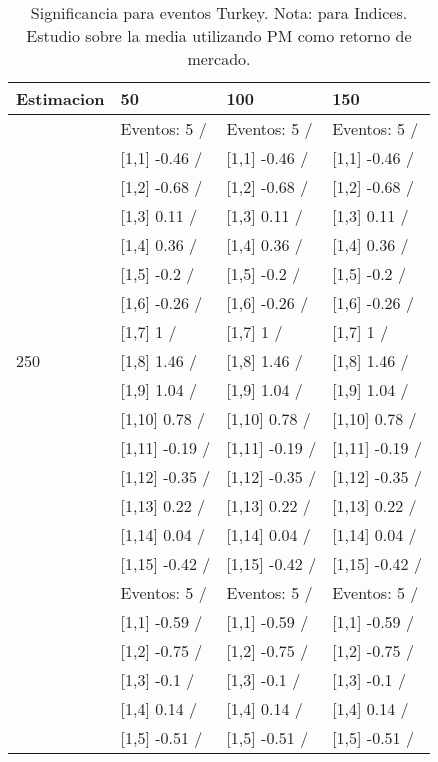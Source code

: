 \begin{table}

\caption{Significancia para eventos Turkey. Nota: para Indices. Estudio sobre la media utilizando PM como retorno de mercado.}
\centering
\begin{tabular}[t]{llll}
\toprule
Estimacion & 50 & 100 & 150\\
\midrule
 & Eventos:  5 / & Eventos:  5 / & Eventos:  5 /\\
 & {}[1,1] -0.46  / & {}[1,1] -0.46  / & {}[1,1] -0.46  /\\
 & {}[1,2] -0.68  / & {}[1,2] -0.68  / & {}[1,2] -0.68  /\\
 & {}[1,3] 0.11  / & {}[1,3] 0.11  / & {}[1,3] 0.11  /\\
 & {}[1,4] 0.36  / & {}[1,4] 0.36  / & {}[1,4] 0.36  /\\
\addlinespace
 & {}[1,5] -0.2  / & {}[1,5] -0.2  / & {}[1,5] -0.2  /\\
 & {}[1,6] -0.26  / & {}[1,6] -0.26  / & {}[1,6] -0.26  /\\
 & {}[1,7] 1  / & {}[1,7] 1  / & {}[1,7] 1  /\\
250 & {}[1,8] 1.46  / & {}[1,8] 1.46  / & {}[1,8] 1.46  /\\
 & {}[1,9] 1.04  / & {}[1,9] 1.04  / & {}[1,9] 1.04  /\\
\addlinespace
 & {}[1,10] 0.78  / & {}[1,10] 0.78  / & {}[1,10] 0.78  /\\
 & {}[1,11] -0.19  / & {}[1,11] -0.19  / & {}[1,11] -0.19  /\\
 & {}[1,12] -0.35  / & {}[1,12] -0.35  / & {}[1,12] -0.35  /\\
 & {}[1,13] 0.22  / & {}[1,13] 0.22  / & {}[1,13] 0.22  /\\
 & {}[1,14] 0.04  / & {}[1,14] 0.04  / & {}[1,14] 0.04  /\\
\addlinespace
 & {}[1,15] -0.42  / & {}[1,15] -0.42  / & {}[1,15] -0.42  /\\
 & Eventos:  5 / & Eventos:  5 / & Eventos:  5 /\\
 & {}[1,1] -0.59  / & {}[1,1] -0.59  / & {}[1,1] -0.59  /\\
 & {}[1,2] -0.75  / & {}[1,2] -0.75  / & {}[1,2] -0.75  /\\
 & {}[1,3] -0.1  / & {}[1,3] -0.1  / & {}[1,3] -0.1  /\\
\addlinespace
 & {}[1,4] 0.14  / & {}[1,4] 0.14  / & {}[1,4] 0.14  /\\
 & {}[1,5] -0.51  / & {}[1,5] -0.51  / & {}[1,5] -0.51  /\\

\end{tabular}
\end{table}
